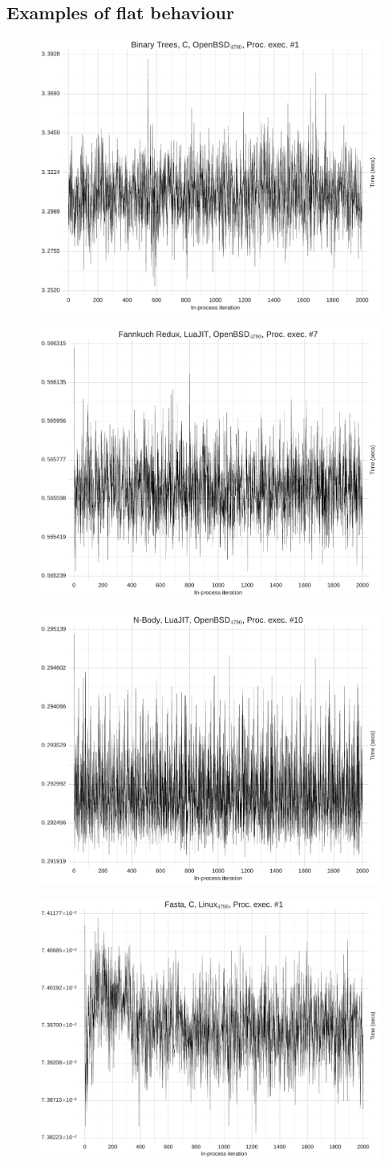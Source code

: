 \documentclass[preprint,numbers,10pt]{sigplanconf}
\begin{document}
\subsection{Examples of flat behaviour}
\begin{figure}[h!]
\centering
\includegraphics[width=.45\textwidth]{category_examples/flat/flat0.pdf}
\end{figure}
\begin{figure}[h!]
\centering
\includegraphics[width=.45\textwidth]{category_examples/flat/flat1.pdf}
\end{figure}
\begin{figure}[h!]
\centering
\includegraphics[width=.45\textwidth]{category_examples/flat/flat2.pdf}
\end{figure}
\begin{figure}[h!]
\centering
\includegraphics[width=.45\textwidth]{category_examples/flat/flat3.pdf}
\end{figure}
\end{document}

